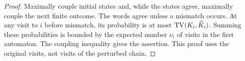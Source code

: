 \begin{proof}
Maximally couple initial states and, while the states agree, maximally
couple the next finite outcome. The words agree unless a mismatch
occurs. At any visit to $i$ before mismatch, its probability is at
most $\operatorname{TV}(K_i,\widetilde K_i)$. Summing these probabilities is bounded
by the expected number $\nu_i$ of visits in the first automaton.
The coupling inequality gives the assertion. This proof uses the
original visits, not visits of the perturbed chain.
\end{proof}
